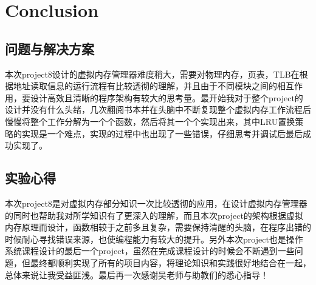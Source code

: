 \documentclass{article}
\begin{document}
\section{Conclusion}

\subsection{问题与解决方案}
本次project8设计的虚拟内存管理器难度稍大，需要对物理内存，页表，TLB在根据地址读取信息的运行流程有比较透彻的理解，并且由于不同模块之间的相互作用，要设计高效且清晰的程序架构有较大的思考量。最开始我对于整个project的设计并没有什么头绪，几次翻阅书本并在头脑中不断复现整个虚拟内存工作流程后慢慢将整个工作分解为一个个函数，然后将其一个个实现出来，其中LRU置换策略的实现是一个难点，实现的过程中也出现了一些错误，仔细思考并调试后最后成功实现了。

\subsection{实验心得}
本次project8是对虚拟内存部分知识一次比较透彻的应用，在设计虚拟内存管理器的同时也帮助我对所学知识有了更深入的理解，而且本次project的架构根据虚拟内存原理而设计，函数相较于之前多且复杂，需要保持清醒的头脑，在程序出错的时候耐心寻找错误来源，也使编程能力有较大的提升。另外本次project也是操作系统课程设计的最后一个project，虽然在完成课程设计的时候会不断遇到一些问题，但最终都顺利实现了所有的项目内容，将理论知识和实践很好地结合在一起，总体来说让我受益匪浅。最后再一次感谢吴老师与助教们的悉心指导！




\end{document}
